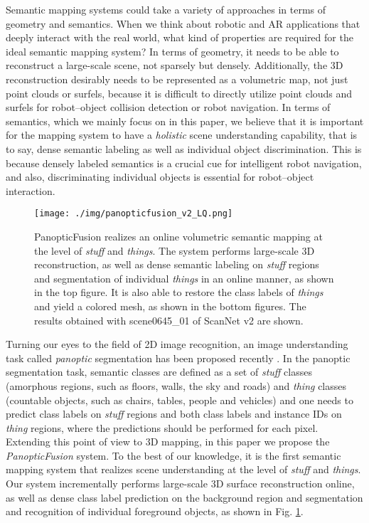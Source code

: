 \documentclass[letterpaper, 10pt, conference]{latex_template/ieeeconf}
\begin{document}
Semantic mapping systems could take a variety of approaches in terms of geometry and semantics. 
When we think about robotic and AR applications that deeply interact with the real world, what kind of properties are required for the ideal semantic mapping system? 
In terms of geometry, it needs to be able to reconstruct a large-scale scene, not sparsely but densely.
Additionally, the 3D reconstruction desirably needs to be represented as a volumetric map, not just point clouds or surfels, because it is difficult to directly utilize point clouds and surfels for robot--object collision detection or robot navigation.
In terms of semantics, which we mainly focus on in this paper, we believe that it is important for the mapping system to have a {\it holistic} scene understanding capability, that is to say, dense semantic labeling as well as individual object discrimination.
This is because densely labeled semantics is a crucial cue for intelligent robot navigation, and also, discriminating individual objects is essential for robot--object interaction.

\begin{figure}[t]
   \centering
      \texttt{[image: ./img/panopticfusion\_v2\_LQ.png]}
      \caption{PanopticFusion realizes an online volumetric semantic mapping at the level of {\it stuff} and {\it things}. The system performs large-scale 3D reconstruction, as well as dense semantic labeling on {\it stuff} regions and segmentation of individual {\it things} in an online manner, as shown in the top figure. It is also able to restore the class labels of {\it things} and yield a colored mesh, as shown in the bottom figures. The results obtained with  scene0645\_01 of ScanNet v2 are shown.}
      \label{fig_panopticfusion}
\end{figure}

Turning our eyes to the field of 2D image recognition, an image understanding task called {\it panoptic} segmentation has been proposed recently \cite{kirillov2018panoptic}.
In the panoptic segmentation task, semantic classes are defined as a set of {\it stuff} classes (amorphous regions, such as floors, walls, the sky and roads) and {\it thing} classes (countable objects, such as chairs, tables, people and vehicles) and one needs to predict class labels on {\it stuff} regions and both class labels and instance IDs on {\it thing} regions, where the predictions should be performed for each pixel. 
Extending this point of view to 3D mapping, in this paper we propose the {\it PanopticFusion} system.
To the best of our knowledge, it is the first semantic mapping system that realizes scene understanding at the level of {\it stuff} and {\it things}.
Our system incrementally performs large-scale 3D surface reconstruction online, as well as dense class label prediction on the background region and segmentation and recognition of individual foreground objects, as shown in Fig. \ref{fig_panopticfusion}.
\end{document}
